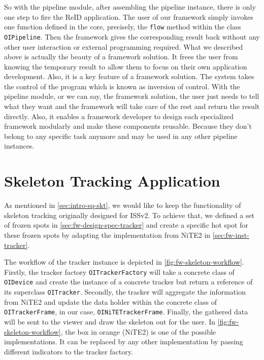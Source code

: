 So with the pipeline module, after assembling the pipeline instance, 
there is only one step to fire the ReID application. The user of our 
framework simply invokes one function defined in the core, precisely, the 
\texttt{flow} method within the class \texttt{OIPipeline}.
Then the framework gives the corresponding result back without any other user 
interaction or external programming required.
What we described above is actually the beauty of a framework solution.
It frees the user from knowing the temporary result to allow them to focus on 
their own application development. Also, it is a key feature of a framework 
solution. The system takes the control of the program which is known as 
inversion of control.
With the pipeline module, or we can say, the framework solution, the user just 
needs to tell what they want and the framework will take care of the rest and 
return the result directly. Also, it enables a framework developer to design each 
specialized framework modularly and make these components reusable. Because 
they don't belong to any specific task anymore and may be used in any other 
pipeline instances.


\section{Skeleton Tracking Application}
\label{sec:fw-app-skt}

As mentioned in \autoref{sec:intro-sq-skt}, we would like to keep the
functionality of skeleton tracking originally designed for ISSv2. To achieve
that, we defined a set of frozen spots in \autoref{sec:fw-design-spec-tracker}
and create a specific hot spot for these frozen spots by adapting the
implementation from NiTE2 in \autoref{sec:fw-inst-tracker}.

The workflow of the tracker instance is depicted in 
\autoref{fig:fw-skeleton-workflow}.
Firstly, the tracker factory \texttt{OITrackerFactory} will take a concrete
class of \texttt{OIDevice} and create the instance of a concrete tracker but
return a reference of its superclass \texttt{OITracker}. Secondly, the tracker
will aggregate the information from NiTE2 and update the data holder within
the concrete class of \texttt{OITrackerFrame}, in our case,
\texttt{OINiTETrackerFrame}. Finally, the gathered data will be sent to
the viewer and draw the skeleton out for the user.
In \autoref{fig:fw-skeleton-workflow}, the box in orange (NiTE2) is one of the
possible implementations. It can be replaced by any other implementation by
passing different indicators to the tracker factory.

